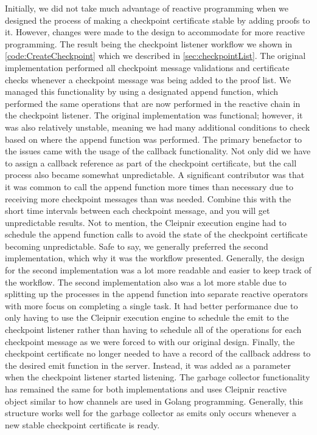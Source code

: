 Initially, we did not take much advantage of reactive programming when we designed the process of making a checkpoint certificate stable by adding proofs to it. However, changes were made to the design to accommodate for more reactive programming. The result being the checkpoint listener workflow we shown in \autoref{code:CreateCheckpoint} which we described in \autoref{sec:checkpointList}. The original implementation performed all checkpoint message validations and certificate checks whenever a checkpoint message was being added to the proof list. We managed this functionality by using a designated append function, which performed the same operations that are now performed in the reactive chain in the checkpoint listener. The original implementation was functional; however, it was also relatively unstable, meaning we had many additional conditions to check based on where the append function was performed. The primary benefactor to the issues came with the usage of the callback functionality. Not only did we have to assign a callback reference as part of the checkpoint certificate, but the call process also became somewhat unpredictable. A significant contributor was that it was common to call the append function more times than necessary due to receiving more checkpoint messages than was needed. Combine this with the short time intervals between each checkpoint message, and you will get unpredictable results. Not to mention, the Cleipnir execution engine had to schedule the append function calls to avoid the state of the checkpoint certificate becoming unpredictable. Safe to say, we generally preferred the second implementation, which why it was the workflow presented. Generally, the design for the second implementation was a lot more readable and easier to keep track of the workflow. The second implementation also was a lot more stable due to splitting up the processes in the append function into separate reactive operators with more focus on completing a single task. It had better performance due to only having to use the Cleipnir execution engine to schedule the emit to the checkpoint listener rather than having to schedule all of the operations for each checkpoint message as we were forced to with our original design. Finally, the checkpoint certificate no longer needed to have a record of the callback address to the desired emit function in the server. Instead, it was added as a parameter when the checkpoint listener started listening.
The garbage collector functionality has remained the same for both implementations and uses Cleipnir reactive  object similar to how channels are used in Golang programming. Generally, this structure works well for the garbage collector as emits only occurs whenever a  new stable checkpoint certificate is ready.



